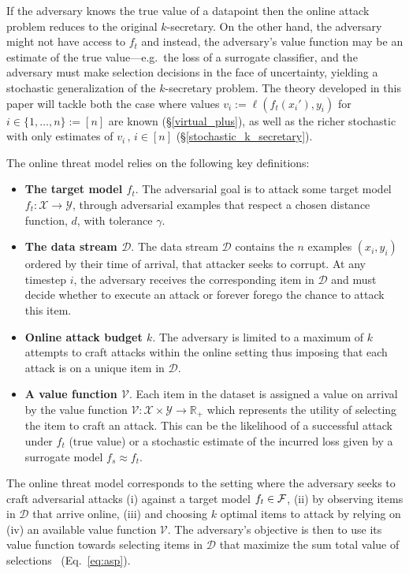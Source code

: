 If the adversary knows the true value of a datapoint then the online attack problem reduces to the original $k$-secretary. On the other hand, the adversary might not have access to $f_t$ and instead, the adversary's value function may be an estimate of the true value---e.g.\ the loss of a surrogate classifier, and the adversary must make selection decisions in the face of uncertainty, yielding a stochastic generalization of the $k$-secretary problem. The theory developed in this paper will tackle both the case where values $v_i:=\ell(f_t(x_i'),y_i)$ for $i \in \{1,\ldots,n\} :=[n]$ are known (\S\ref{virtual_plus}), as well as the richer stochastic with only estimates of $v_i\,,\, i \in [n]$ (\S\ref{stochastic_k_secretary}).

\begin{ftheo}
The online threat model relies on the following key definitions:
\begin{itemize}[leftmargin=*, itemsep=1pt, topsep=1pt, parsep=1pt]
\item 
\textbf{The target model $f_t$}. The adversarial goal is to attack some target model $f_t : \mathcal{X} \rightarrow \mathcal{Y}$, through adversarial examples that respect a chosen distance function, $d$, with tolerance $\gamma$. %

\item
\textbf{The data stream $\mathcal{D}$}. The data stream $\mathcal{D}$ contains the $n$ examples $(x_i,y_i)$ ordered by their time of arrival, that attacker seeks to corrupt. At any timestep $i$, the adversary receives the corresponding item in $\mathcal{D}$ and must decide whether to execute an attack or forever forego the chance to attack this item.

\item
\textbf{Online attack budget $k$}. The adversary is limited to a maximum of $k$ attempts to craft attacks within the online setting thus imposing that each attack is on a unique item in $\mathcal{D}$.

\item
\textbf{A value function $\mathcal{V}$}. Each item in the dataset is assigned a value on arrival by the value function $\mathcal{V}: \mathcal{X} \times \mathcal{Y} \rightarrow \mathbb{R}_+$ which represents the utility of selecting the item to craft an attack. This can be the likelihood of a successful attack under $f_t$ (true value) or a stochastic estimate of the incurred loss given by a surrogate model $f_s \approx f_t$.
\end{itemize}

The online threat model corresponds to the setting where the adversary seeks to craft adversarial attacks (i) against a target model $f_t \in {\mathcal{F}}$, (ii) by observing items in $\mathcal{D}$ that arrive online, (iii) and choosing $k$ optimal items to attack by relying on (iv) an available value function $\mathcal{V}$. The adversary's objective is then to use its value function towards selecting items in $\mathcal{D}$ that maximize the sum total value of selections \setvalue\ (Eq.~\ref{eq:asp}).
\end{ftheo}



